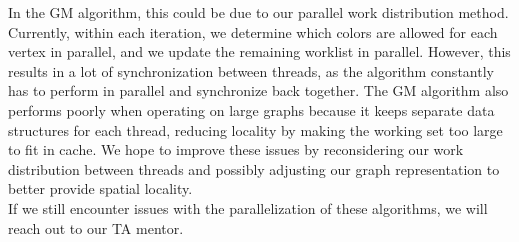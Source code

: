\documentclass[11pt]{article}
\begin{document}
In the GM algorithm, this could be due to our parallel work distribution method. Currently, within each iteration, we determine which colors are allowed for each vertex in parallel, and we update the remaining worklist in parallel. However, this results in a lot of synchronization between threads, as the algorithm constantly has to perform in parallel and synchronize back together. The GM algorithm also performs poorly when operating on large graphs because it keeps separate data structures for each thread, reducing locality by making the working set too large to fit in cache. We hope to improve these issues by reconsidering our work distribution between threads and possibly adjusting our graph representation to better provide spatial locality.\\

If we still encounter issues with the parallelization of these algorithms, we will reach out to our TA mentor.\\
\end{document}
